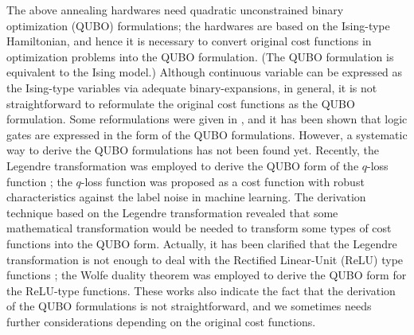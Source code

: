 \documentclass[fp,twocolumn]{jpsj3}
\begin{document}
The above annealing hardwares need quadratic unconstrained binary optimization (QUBO) formulations; the hardwares are based on the Ising-type Hamiltonian, and hence it is necessary to convert original cost functions in optimization problems into the QUBO formulation. 
(The QUBO formulation is equivalent to the Ising model.)
Although continuous variable can be expressed as the Ising-type variables via adequate binary-expansions, in general, it is not straightforward to reformulate the original cost functions as the QUBO formulation.
Some reformulations were given in \cite{Lucas2014}, and it has been shown that logic gates are expressed in the form of the QUBO formulations.
However, a systematic way to derive the QUBO formulations has not been found yet.
Recently, the Legendre transformation was employed to derive the QUBO form of the $q$-loss function \cite{q-loss}; 
the $q$-loss function was proposed as a cost function with robust characteristics against the label noise in machine learning. 
The derivation technique based on the Legendre transformation revealed that some mathematical transformation would be needed to transform some types of cost functions into the QUBO form.
Actually, it has been clarified that the Legendre transformation is not enough to deal with the Rectified Linear-Unit (ReLU) type functions \cite{relu};
the Wolfe duality theorem \cite{wolfe} was employed to derive the QUBO form for the ReLU-type functions.
These works also indicate the fact that the derivation of the QUBO formulations is not straightforward, and we sometimes needs further considerations depending on the original cost functions.



\end{document}
